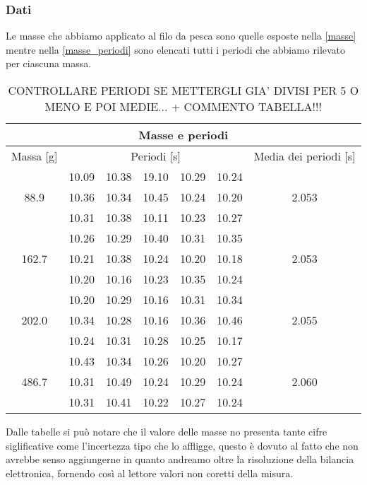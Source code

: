\subsubsection{Dati}
Le masse che abbiamo applicato al filo da pesca sono quelle esposte nella \ref{masse} mentre nella \ref{masse_periodi} sono elencati tutti i periodi che abbiamo rilevato per ciascuna massa.\\

\begin{table}
    \centering
    \begin{tabular}{c c c c c c c}
        \multicolumn{7}{c}{\textbf{Masse e periodi}} \\
        \toprule
        Massa [\si{\gram}] & \multicolumn{5}{c}{Periodi [s]} & Media dei periodi [s]\\
        \midrule
	\multirow{3}{*}{88.9}	& 10.09	& 10.38	& 19.10	& 10.29	& 10.24 & \multirow{3}{*}{2.053}\\
				& 10.36	& 10.34	& 10.45	& 10.24	& 10.20 &\\
				& 10.31	& 10.38	& 10.11	& 10.23	& 10.27 &\\
				\midrule
	\multirow{3}{*}{162.7}	& 10.26	& 10.29	& 10.40	& 10.31	& 10.35 & \multirow{3}{*}{2.053}\\
				& 10.21	& 10.38	& 10.24	& 10.20	& 10.18	\\
				& 10.20	& 10.16	& 10.23	& 10.35	& 10.24 \\
				\midrule
	\multirow{3}{*}{202.0}	& 10.20	& 10.29	& 10.16	& 10.31	& 10.34 & \multirow{3}{*}{2.055}\\
				& 10.34	& 10.28	& 10.16	& 10.36	& 10.46 \\
				& 10.24	& 10.31	& 10.28	& 10.25	& 10.17 \\
				\midrule
	\multirow{3}{*}{486.7}	& 10.43	& 10.34	& 10.26	& 10.20	& 10.27 & \multirow{3}{*}{2.060}\\
				& 10.31	& 10.49	& 10.24	& 10.29	& 10.24 \\
				& 10.31	& 10.41	& 10.22	& 10.27	& 10.24 \\
        \bottomrule
    \end{tabular}
    \caption{CONTROLLARE PERIODI SE METTERGLI GIA' DIVISI PER 5 O MENO E POI MEDIE... + COMMENTO TABELLA!!!}
    \label{tab:masse_periodi}
\end{table}

Dalle tabelle si può notare che il valore delle masse no presenta tante cifre siglificative come l'incertezza tipo che lo affligge, questo è dovuto al fatto che non avrebbe senso aggiungerne in quanto andreamo oltre la risoluzione della bilancia elettronica, fornendo così al lettore valori non coretti della misura.\\

